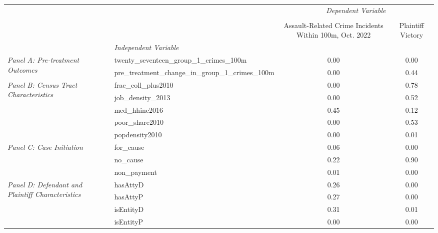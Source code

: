 \begin{tabular}{llcc}
\toprule
 &  & \multicolumn{2}{c}{\textit{Dependent Variable}} \\
\cline{3-4}
\\
 &  & Assault-Related Crime Incidents Within 100m, Oct. 2022 & Plaintiff Victory \\
 & \emph{Independent Variable} &  &  \\
\midrule
\multirow[c]{2}{3cm}{\textit{Panel A: Pre-treatment Outcomes}} & twenty_seventeen_group_1_crimes_100m & 0.00 & 0.00 \\
 & pre_treatment_change_in_group_1_crimes_100m & 0.00 & 0.44 \\
\cline{1-4}
\multirow[c]{5}{3cm}{\textit{Panel B: Census Tract Characteristics}} & frac_coll_plus2010 & 0.00 & 0.78 \\
 & job_density_2013 & 0.00 & 0.52 \\
 & med_hhinc2016 & 0.45 & 0.12 \\
 & poor_share2010 & 0.00 & 0.53 \\
 & popdensity2010 & 0.00 & 0.01 \\
\cline{1-4}
\multirow[c]{3}{3cm}{\textit{Panel C: Case Initiation}} & for_cause & 0.06 & 0.00 \\
 & no_cause & 0.22 & 0.90 \\
 & non_payment & 0.01 & 0.00 \\
\cline{1-4}
\multirow[c]{4}{3cm}{\textit{Panel D: Defendant and Plaintiff Characteristics}} & hasAttyD & 0.26 & 0.00 \\
 & hasAttyP & 0.27 & 0.00 \\
 & isEntityD & 0.31 & 0.01 \\
 & isEntityP & 0.00 & 0.00 \\
\cline{1-4}
\bottomrule
\end{tabular}
